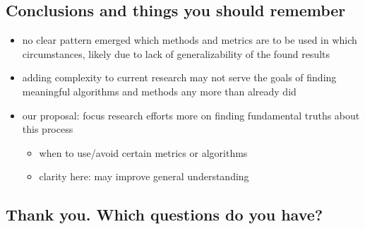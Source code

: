 \documentclass[11pt]{article}
\begin{document}
\subsection*{Conclusions and things you should remember}
\label{sec:org830c20d}
\begin{itemize}
\item no clear pattern emerged which methods and metrics are to be used in which circumstances, likely due to lack of generalizability of the found results
\item adding complexity to current research may not serve the goals of finding meaningful algorithms and methods any more than already did
\item our proposal: focus research efforts more on finding fundamental truths about this process
\begin{itemize}
\item when to use/avoid certain metrics or algorithms
\item clarity here: may improve general understanding
\end{itemize}
\end{itemize}
\subsection*{Thank you. Which questions do you have?}
\label{sec:orgb99882d}
\end{document}

